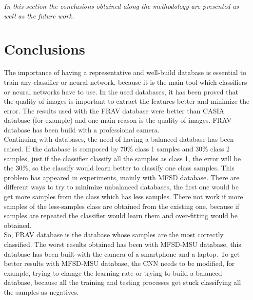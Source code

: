 \minitoc
\mtcskip

\begin{small}
\emph{In this section the conclusions obtained along the methodology are presented as well as the future work.\\}
\end{small}

\section{Conclusions}
The importance of having a representative and well-build database is essential to train any classifier or neural network, because it is the main tool which classifiers or neural networks have to use. In the used databases, it has been proved that the quality of images is important to extract the features better and minimize the error. The results used with the FRAV database were better than CASIA database (for example) and one main reason is the quality of images. FRAV database has been build with a professional camera.\\

Continuing with databases, the need of having a balanced database has been raised. If the database is composed by 70\% class 1 samples and 30\% class 2 samples, just if the classifier classify all the samples as class 1, the error will be the 30\%, so the classify would learn better to classify one class samples. This problem has appeared in experiments, mainly with MFSD database. There are different ways to try to minimize unbalanced databases, the first one would be get more samples from the class which has less samples. There not work if more samples of the less-samples class are obtained from the existing one, because if samples are repeated the classifier would learn them and over-fitting would be obtained.\\

So, FRAV database is the database whose samples are the most correctly classified. The worst results obtained has been with MFSD-MSU database, this database has been built with the camera of a smartphone and a laptop. To get better results with MFSD-MSU database, the CNN needs to be modified, for example, trying to change the learning rate or trying to build a balanced database, because all the training and testing processes get stuck classifying all the samples as negatives.\\

